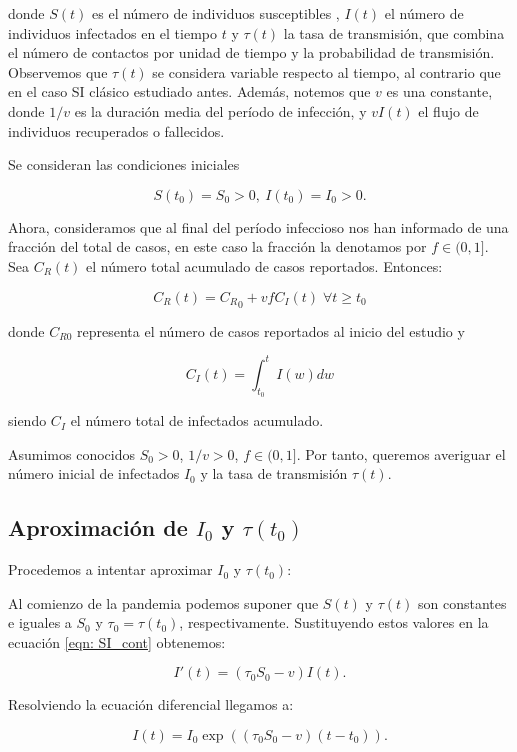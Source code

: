 donde $S(t)$ es el número de individuos susceptibles , $I(t)$ el número de individuos infectados en el tiempo $t$ y $\tau (t)$ la tasa de transmisión, que combina el número de contactos por unidad de tiempo y la probabilidad de transmisión. Observemos que $\tau (t)$ se considera variable respecto al tiempo, al contrario que en el caso SI clásico estudiado antes. Además, notemos que $v$ es una constante, donde $1/v$ es la duración media del período de infección, y $vI(t)$ el flujo de individuos recuperados o fallecidos. %

Se consideran las condiciones iniciales

$$S(t_0)=S_0>0, \: I(t_0)=I_0>0.$$

Ahora, consideramos que al final del período infeccioso nos han informado de una fracción del total de casos, en este caso la fracción la denotamos por $f\in (0,1]$. Sea $C_R(t)$ el número total acumulado de casos reportados. Entonces:

\begin{equation}
\label{eqn: acumulada}
C_R(t) = {C_R}_0 + vfC_I(t) \; \forall t \geq t_0
\end{equation}

donde $C_{R0}$ representa el número de casos reportados al inicio del estudio y 

$$C_I(t) = \int_{t_0}^t I(w) dw $$

siendo $C_I$ el número total de infectados acumulado.

Asumimos conocidos $S_0 > 0$, $1/v>0$, $f\in (0,1]$. Por tanto, queremos averiguar el número inicial de infectados $I_0$ y la tasa de transmisión $\tau (t)$.

\subsection{Aproximación de $I_0$ y $\tau (t_0)$}
Procedemos a intentar aproximar $I_0$ y $\tau (t_0)$:

Al comienzo de la pandemia podemos suponer que $S(t)$ y $\tau (t)$ son constantes e iguales a $S_0$ y $\tau_0 = \tau (t_0)$, respectivamente. Sustituyendo estos valores en la ecuación \eqref{eqn: SI_cont} obtenemos:

$$I'(t) = (\tau_0 S_0 -v) I(t).$$

Resolviendo la ecuación diferencial llegamos a:

$$I(t) = I_0\exp{((\tau_0 S_0-v)(t-t_0))}.$$


